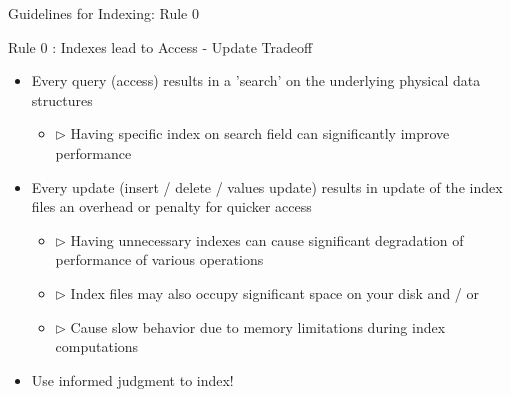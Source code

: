 \documentclass[aspectratio=169, xcolor=dvipsnames]{beamer}
\begin{document}
\begin{frame}{Guidelines for Indexing: Rule 0}
    \begin{alertblock}{Rule 0 : Indexes lead to Access - Update Tradeoff}
        \begin{itemize}[<+->]
            \item Every query (access) results in a 'search' on the underlying physical data structures
            \begin{itemize}
                \item $\triangleright$ Having specific index on search field can significantly improve performance
            \end{itemize}
            \item Every update (insert / delete / values update) results in update of the index files an overhead or penalty for quicker access
            \begin{itemize}[<+->]
                \item $\triangleright$ Having unnecessary indexes can cause significant degradation of performance of various operations
                \item $\triangleright$ Index files may also occupy significant space on your disk and / or
                \item $\triangleright$ Cause slow behavior due to memory limitations during index computations
            \end{itemize}
            \item Use informed judgment to index!
        \end{itemize}
    \end{alertblock}
\end{frame}
\end{document}
